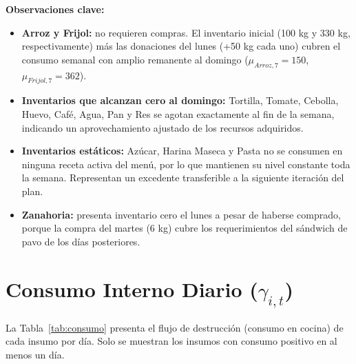 \documentclass[12pt]{report}
\begin{document}
\noindent\textbf{Observaciones clave:}
\begin{itemize}
    \item \textbf{Arroz y Frijol:} no requieren compras. El inventario inicial (100 kg y 330 kg,
          respectivamente) más las donaciones del lunes (+50 kg cada uno) cubren el consumo
          semanal con amplio remanente al domingo ($\mu_{Arroz,7} = 150$, $\mu_{Frijol,7} = 362$).
    \item \textbf{Inventarios que alcanzan cero al domingo:} Tortilla, Tomate, Cebolla, Huevo,
          Café, Agua, Pan y Res se agotan exactamente al fin de la semana, indicando un
          aprovechamiento ajustado de los recursos adquiridos.
    \item \textbf{Inventarios estáticos:} Azúcar, Harina Maseca y Pasta no se consumen en
          ninguna receta activa del menú, por lo que mantienen su nivel constante toda la semana.
          Representan un excedente transferible a la siguiente iteración del plan.
    \item \textbf{Zanahoria:} presenta inventario cero el lunes a pesar de haberse comprado,
          porque la compra del martes (6 kg) cubre los requerimientos del sándwich de pavo
          de los días posteriores.
\end{itemize}

\section{Consumo Interno Diario ($\gamma_{i,t}$)}

La Tabla~\ref{tab:consumo} presenta el flujo de destrucción (consumo en cocina) de cada
insumo por día. Solo se muestran los insumos con consumo positivo en al menos un día.
\end{document}
